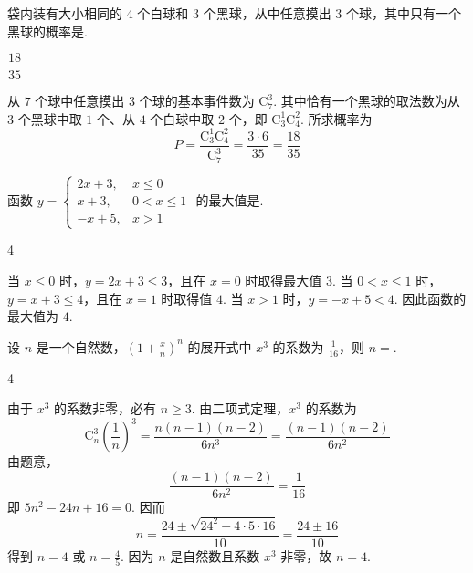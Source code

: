 \documentclass[UTF8,a4paper,oneside,11pt]{ctexbook}
\begin{document}
\begin{problem}
袋内装有大小相同的 \(4\) 个白球和 \(3\) 个黑球，从中任意摸出 \(3\) 个球，其中只有一个黑球的概率是\fillinblank{}.
\end{problem}

\begin{answer}
\(\dfrac{18}{35}\)
\end{answer}

\begin{solution}
从 \(7\) 个球中任意摸出 \(3\) 个球的基本事件数为 \(\mathrm C_7^3\). 其中恰有一个黑球的取法数为从 \(3\) 个黑球中取 \(1\) 个、从 \(4\) 个白球中取 \(2\) 个，即 \(\mathrm C_3^1\mathrm C_4^2\). 所求概率为
\[
P=\frac{\mathrm C_3^1\mathrm C_4^2}{\mathrm C_7^3}=\frac{3\cdot6}{35}=\frac{18}{35}
\]
\end{solution}

\begin{problem}
函数 \(y=\begin{cases}
2x+3,&x\leqslant0\\
x+3,&0<x\leqslant1\\
-x+5,&x>1
\end{cases}\) 的最大值是\fillinblank{}.
\end{problem}

\begin{answer}
4
\end{answer}

\begin{solution}
当 \(x\leqslant0\) 时，\(y=2x+3\leqslant3\)，且在 \(x=0\) 时取得最大值 \(3\). 当 \(0<x\leqslant1\) 时，\(y=x+3\leqslant4\)，且在 \(x=1\) 时取得值 \(4\). 当 \(x>1\) 时，\(y=-x+5<4\). 因此函数的最大值为 \(4\).
\end{solution}

\begin{problem}
设 \(n\) 是一个自然数，\(\left(1+\frac{x}{n}\right)^{n} \) 的展开式中 \(x^{3} \) 的系数为 \(\frac{1}{16} \)，则 \(n=\)\fillinblank{}.
\end{problem}

\begin{answer}
4
\end{answer}

\begin{solution}
由于 \(x^3\) 的系数非零，必有 \(n\geqslant3\). 由二项式定理，\(x^3\) 的系数为
\[
\mathrm C_n^3\left(\frac1n\right)^3=\frac{n(n-1)(n-2)}{6n^3}=\frac{(n-1)(n-2)}{6n^2}
\]
由题意，
\[
\frac{(n-1)(n-2)}{6n^2}=\frac1{16}
\]
即 \(5n^2-24n+16=0\). 因而
\[
n=\frac{24\pm\sqrt{24^2-4\cdot5\cdot16}}{10}=\frac{24\pm16}{10}
\]
得到 \(n=4\) 或 \(n=\frac45\). 因为 \(n\) 是自然数且系数 \(x^3\) 非零，故 \(n=4\).
\end{solution}
\end{document}
